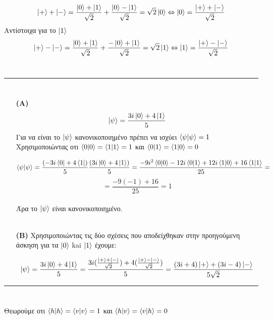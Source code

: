 \documentclass[12pt]{article}
\begin{document}
$$ \ket{+} + \ket{-} =\frac{\ket{0}+\ket{1}}{\sqrt{2}}+ \frac{\ket{0}-\ket{1}}{\sqrt{2}} = \sqrt{2}\ket{0}\Leftrightarrow\ket{0}=\frac{\ket{+}+\ket{-}}{\sqrt{2}}$$
Αντίστοιχα για το $\ket{1}$
$$ \ket{+} - \ket{-} =\frac{\ket{0}+\ket{1}}{\sqrt{2}}+ \frac{-\ket{0}+\ket{1}}{\sqrt{2}} = \sqrt{2}\ket{1}\Leftrightarrow\ket{1}=\frac{\ket{+}-\ket{-}}{\sqrt{2}}$$
\\\rule{\textwidth}{.5pt}
\section*{{}}
\begin{enumerate}
\item [\bf{ (A)}]
$$\ket{\psi}  = \frac{3i\ket{0}+4\ket{1}}{5}$$
Για να είναι το $\ket{\psi}$ κανονικοποιημένο πρέπει να ισχύει $\braket{\psi|\psi}=1$ \\
Χρησιμοποιώντας οτι $ \braket{0|0}=\braket{1|1}=1$ και $ \braket{0|1}=\braket{1|0}=0$

$$ \braket{\psi|\psi} = \frac{(-3i\bra{0}+4\bra{1})}{5}\frac{(3i\ket{0}+4\ket{1})}{5} = \frac{-9i^2\braket{0|0}-12i\braket{0|1}+12i\braket{1|0}+16\braket{1|1}}{25}=$$
$$=\frac{-9(-1)+16}{25}=1 $$\\
Άρα το $\ket{\psi}$ είναι κανονικοποιημένο.\\ \\
\item [\bf{ (B)}]
Χρησιμοποιώντας τις δύο σχέσεις που αποδείχθηκαν στην προηγούμενη άσκηση για τα $\ket{0}$ kai $\ket{1}$ έχουμε:


$$\ket{\psi}  = \frac{3i\ket{0}+4\ket{1}}{5} =  \frac{3i(\frac{\ket{+}+\ket{-}}{\sqrt{2}})+4(\frac{\ket{+}-\ket{-}}{\sqrt{2}})}{5} = \frac{(3i+4)\ket{+}+(3i-4)\ket{-}}{5\sqrt{2}} $$
\end{enumerate}
\rule{\textwidth}{.5pt}
\section*{{}}

Θεωρούμε οτι $ \braket{h|h}=\braket{v|v}=1$ και $ \braket{h|v}=\braket{v|h}=0$\\
\end{document}
